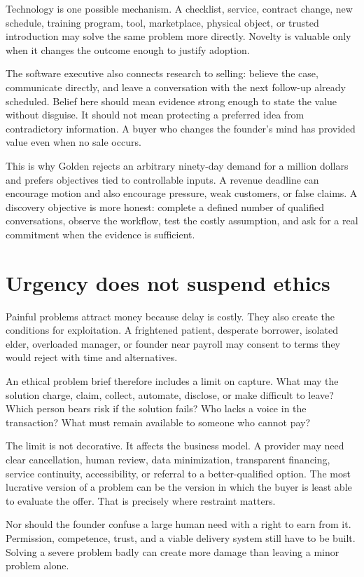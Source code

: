 Technology is one possible mechanism. A checklist, service, contract change,
new schedule, training program, tool, marketplace, physical object, or trusted
introduction may solve the same problem more directly. Novelty is valuable only
when it changes the outcome enough to justify adoption.

The software executive also connects research to selling: believe the case,
communicate directly, and leave a conversation with the next follow-up already
scheduled. Belief here should mean evidence strong enough to state the value
without disguise. It should not mean protecting a preferred idea from
contradictory information. A buyer who changes the founder's mind has provided
value even when no sale occurs.

This is why Golden rejects an arbitrary ninety-day demand for a million dollars
and prefers objectives tied to controllable inputs. A revenue deadline can
encourage motion and also encourage pressure, weak customers, or false claims.
A discovery objective is more honest: complete a defined number of qualified
conversations, observe the workflow, test the costly assumption, and ask for a
real commitment when the evidence is sufficient.

\section{Urgency does not suspend ethics}

Painful problems attract money because delay is costly. They also create the
conditions for exploitation. A frightened patient, desperate borrower,
isolated elder, overloaded manager, or founder near payroll may consent to
terms they would reject with time and alternatives.

An ethical problem brief therefore includes a limit on capture. What may the
solution charge, claim, collect, automate, disclose, or make difficult to leave?
Which person bears risk if the solution fails? Who lacks a voice in the
transaction? What must remain available to someone who cannot pay?

The limit is not decorative. It affects the business model. A provider may need
clear cancellation, human review, data minimization, transparent financing,
service continuity, accessibility, or referral to a better-qualified option.
The most lucrative version of a problem can be the version in which the buyer
is least able to evaluate the offer. That is precisely where restraint matters.

Nor should the founder confuse a large human need with a right to earn from it.
Permission, competence, trust, and a viable delivery system still have to be
built. Solving a severe problem badly can create more damage than leaving a
minor problem alone.


